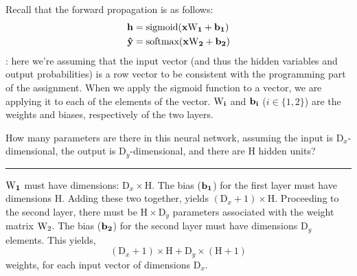 \noindent Recall that the forward propagation is as follows:
\begin{align}
{\bf h} & = \textrm{sigmoid}({\bf x\textrm{W}_{1} + b_{1}}) \\
{\bf \hat{y}} & = \textrm{softmax}({\bf x\textrm{W}_{2} + b_{2}})
\end{align}
: here we're assuming that the input vector (and thus the hidden variables and output probabilities)
is a row vector to be consistent with the programming part of the assignment. When we apply the sigmoid function to
a vector, we are applying it to each of the elements of the vector. $\bf{\textrm{W}}_i$ and $\bf{b}_{i}$ ($i\in\{1,2\}$) are
the weights and biases, respectively of the two layers.
\clearpage

\bigskip
\noindent How many parameters are there in this neural network, assuming the input is $\textrm{D}_{x}$-dimensional,
the output is $\textrm{D}_{y}$-dimensional, and there are H hidden units?

\noindent\rule{\textwidth}{0.4pt}

\noindent 
$\bf{\textrm{W}}_{1}$ must have dimensions:  $\textrm{D}_{x}\times\textrm{H}$. The bias ($\bf{b}_{1}$) for the first layer must have
dimensions $\textrm{H}$. Adding these two together, yields $(\textrm{D}_{x} + 1)\times\textrm{H}$. Proceeding to the second layer,
there must be $\textrm{H}\times\textrm{D}_{y}$ parameters associated with the weight matrix ${\bf\textrm{W}}_{2}$. The bias ($\bf{b}_{2}$)
for the second layer must have dimensions $\textrm{D}_{y}$ elements. This yields, 
\begin{equation}
(\textrm{D}_{x} + 1)\times\textrm{H} + \textrm{D}_{y}\times(\textrm{H}+1)
\end{equation}
weights, for each input vector of dimensions $\textrm{D}_{x}$.
\clearpage
{}

\bigskip

\clearpage
{}

